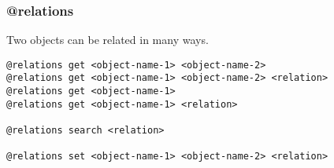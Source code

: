 \subsubsection{@relations}
\label{relations}

Two objects can be related in many ways.

\begin{verbatim}
@relations get <object-name-1> <object-name-2>
@relations get <object-name-1> <object-name-2> <relation>
@relations get <object-name-1>
@relations get <object-name-1> <relation>

@relations search <relation>

@relations set <object-name-1> <object-name-2> <relation>
\end{verbatim}